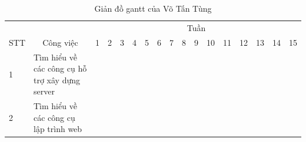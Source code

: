 \begin{landscape}
\begin{table}[]
\centering
\caption{Giản đồ gantt của Võ Tấn Tùng}
\begin{tabular}{|l|l|l|l|l|l|l|l|l|l|l|l|l|l|l|l|l|}
\hline
\multicolumn{1}{|c|}{}                      & \multicolumn{1}{c|}{}                                                                                            & \multicolumn{15}{c|}{Tuần}                                                                                                                                                                                                                                                                                                                                                                                                                                                              \\ \cline{3-17} 
\multicolumn{1}{|c|}{\multirow{-2}{*}{STT}} & \multicolumn{1}{c|}{\multirow{-2}{*}{Công việc}}                                                                 & 1                        & 2                                               & 3                        & 4                        & 5                        & 6                        & 7                                               & 8                        & 9                        & 10                                              & 11                       & 12                       & 13                       & 14                       & 15                       \\ \hline
1                                           & Tìm hiểu về các công cụ hỗ trợ xây dựng server                                                                   & \cellcolor[HTML]{000000} & \cellcolor[HTML]{000000}                        &                          &                          &                          &                          &                                                 &                          &                          &                                                 &                          &                          &                          &                          &                          \\ \hline
2                                           & Tìm hiểu về các công cụ lập trình web                                                                            &                          & \cellcolor[HTML]{000000}{\color[HTML]{FFFFFF} } &                          &                          &                          &                          &                                                 &                          &                          &                                                 &                          &                          &                          &                          &                          \\ \hline

\end{tabular}
\end{table}
\end{landscape}
